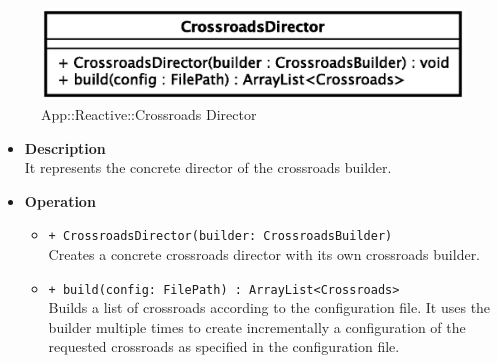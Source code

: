 \begin{figure}[h]
\centering
\includegraphics[scale=0.6,keepaspectratio]{images/solution/crossroads_director.eps}
\caption{App::Reactive::Crossroads Director}
\label{fig:sd-app-crossroads_director}
\end{figure}
\FloatBarrier
\begin{itemize}
  \item \textbf{Description} \\
    It represents the concrete director of the crossroads builder.
  \item \textbf{Operation}
  \begin{itemize} 
    \item \texttt{+ CrossroadsDirector(builder: CrossroadsBuilder)} \\
Creates a concrete crossroads director with its own crossroads builder.
    \item \texttt{+ build(config: FilePath) : ArrayList<Crossroads>} \\
Builds a list of crossroads according to the configuration file. 
It uses the builder multiple times 
to create incrementally a configuration of the requested crossroads as specified
in the configuration file. 
  \end{itemize}
\end{itemize}
